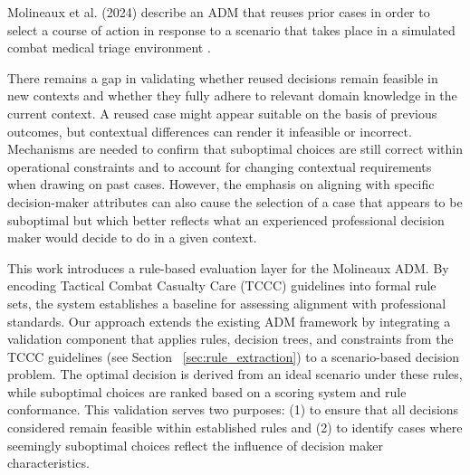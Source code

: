 \documentclass[conference]{IEEEtran}
\begin{document}
Molineaux et al. (2024) describe an ADM that reuses prior cases in order to select a course of action in response to a scenario that takes place in a simulated combat medical triage environment \cite{molineaux_aligning_2024}. 

There remains a gap in validating whether reused decisions remain feasible in new contexts and whether they fully adhere to relevant domain knowledge in the current context. A reused case might appear suitable on the basis of previous outcomes, but contextual differences can render it infeasible or incorrect. Mechanisms are needed to confirm that suboptimal choices are still correct within operational constraints and to account for changing contextual requirements when drawing on past cases. However, the emphasis on aligning with specific decision-maker attributes can also cause the selection of a case that appears to be suboptimal but which better reflects what an experienced professional decision maker would decide to do in a given context.

This work introduces a rule-based evaluation layer for the Molineaux ADM. By encoding Tactical Combat Casualty Care (TCCC) guidelines into formal rule sets, the system establishes a baseline for assessing alignment with professional standards. Our approach extends the existing ADM framework by integrating a validation component that applies rules, decision trees, and constraints from the TCCC guidelines (see Section ~\ref{sec:rule_extraction}) to a scenario-based decision problem. The optimal decision is derived from an ideal scenario under these rules, while suboptimal choices are ranked based on a scoring system and rule conformance. This validation serves two purposes: (1) to ensure that all decisions considered remain feasible within established rules and (2) to identify cases where seemingly suboptimal choices reflect the influence of decision maker characteristics.
\end{document}
